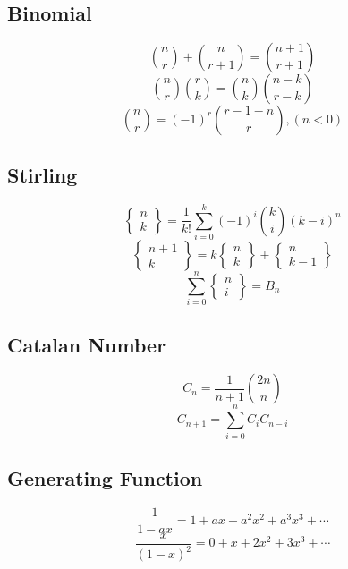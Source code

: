 \documentclass{article}
\begin{document}
\begin{multicols}{3}[
	\maketitle
    \begin{center}
        \rule{\textwidth}{2pt}
    \end{center}
]
‌\subsection{Binomial}
\begin{equation*}
    {\binom{n}{r}} + {\binom{n}{r+1}} = {\binom{n+1}{r+1}}
\end{equation*}
\begin{equation*}
    {\binom{n}{r}}{\binom{r}{k}} = {\binom{n}{k}}{\binom{n-k}{r-k}}
\end{equation*}
\begin{equation*}
    {\binom{n}{r}} = (-1)^r {\binom{r-1-n}{r}} , (n < 0)
\end{equation*}

\subsection{Stirling}
\begin{equation*}
    \left\{ \substack{n\\k} \right\} = \frac{1}{k!} \sum \limits_{i=0}^k (-1)^i {\binom{k}{i}}(k-i)^n
\end{equation*}
\begin{equation*}
    \left\{ \substack{n+1\\k} \right\} = k \left\{ \substack{n\\k} \right\} + \left\{ \substack{n\\k-1} \right\}
\end{equation*}
\begin{equation*}
    \sum \limits_{i = 0}^n \left\{ \substack{n\\i} \right\} = B_n
\end{equation*}

\subsection{Catalan Number}
\begin{equation*}
    C_n = \frac{1}{n+1} {\binom{2n}{n}}
\end{equation*}
\begin{equation*}
    C_{n+1} = \sum \limits_{i=0}^n C_i C_{n-i}
\end{equation*}

\subsection{Generating Function}
\begin{equation*}
    \frac{1}{1-ax} = 1 + ax + a^2x^2 + a^3x^3 + \cdots
\end{equation*}
\begin{equation*}
    \frac{x}{(1-x)^2} = 0 + x + 2x^2 + 3x^3 + \cdots
\end{equation*}


\end{multicols}
\end{document}
